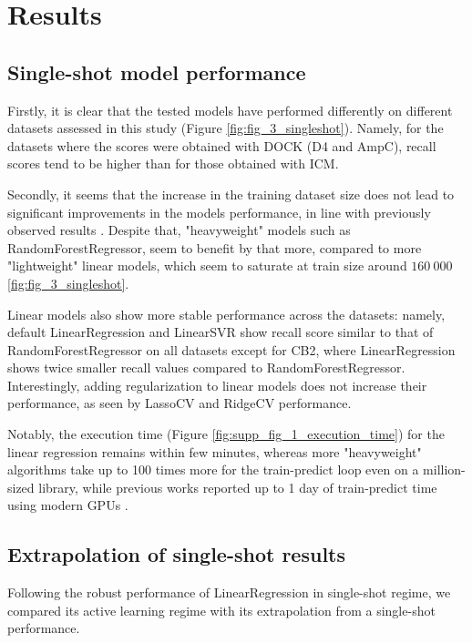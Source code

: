 \section{Results}

\subsection{Single-shot model performance}
\label{subsection:single-shot}

Firstly, it is clear that the tested models have performed differently on different datasets assessed in this study (Figure \ref{fig:fig_3_singleshot}). Namely, for the datasets where the scores were obtained with DOCK (D4 and AmpC), recall scores tend to be higher than for those obtained with ICM.

Secondly, it seems that the increase in the training dataset size does not lead to significant improvements in the models performance, in line with previously observed results \cite{Yang2021_shoichet_active_learning}. Despite that, "heavyweight" models such as RandomForestRegressor, seem to benefit by that more, compared to more "lightweight" linear models, which seem to saturate at train size around $160\ 000$ \ref{fig:fig_3_singleshot}.

Linear models also show more stable performance across the datasets: namely, default LinearRegression and LinearSVR show recall score similar to that of RandomForestRegressor on all datasets except for CB2, where LinearRegression shows twice smaller recall values compared to RandomForestRegressor. Interestingly, adding regularization to linear models does not increase their performance, as seen by LassoCV and RidgeCV performance.

Notably, the execution time (Figure \ref{fig:supp_fig_1_execution_time}) for the linear regression remains within few minutes, whereas more "heavyweight" algorithms take up to 100 times more for the train-predict loop even on a million-sized library, while previous works reported up to 1 day of train-predict time using modern GPUs \cite{deepdocking}.


\subsection{Extrapolation of single-shot results}
Following the robust performance of LinearRegression in single-shot regime, we compared its active learning regime with its extrapolation from a single-shot performance.

